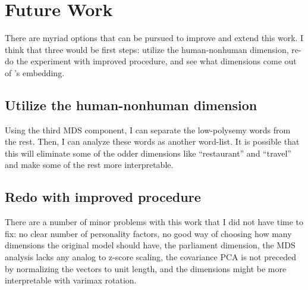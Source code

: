 \chapter{Future Work}


There are myriad options that can be pursued to improve and extend this work.
I think that three would be first steps: utilize the human-nonhuman dimension,
re-do the experiment with improved procedure, and see what dimensions come
out of \citep{Samsonovich2010}'s embedding.

\section{Utilize the human-nonhuman dimension}

Using the third MDS component, I can separate the low-polysemy words from the 
rest. Then, I can analyze these words as another word-list. It is possible
that this will eliminate some of the odder dimensions like ``restaurant'' and
``travel'' and make some of the rest more interpretable.

\section{Redo with improved procedure}

There are a number of minor problems with this work that I did not have time to
fix: no clear number of personality factors, no good way of choosing how many 
dimensions the original model should have, the parliament dimension, the 
MDS analysis lacks any analog to z-score scaling, the covariance PCA is not
preceded by normalizing the vectors to unit length, and the dimensions might
be more interpretable with varimax rotation.

